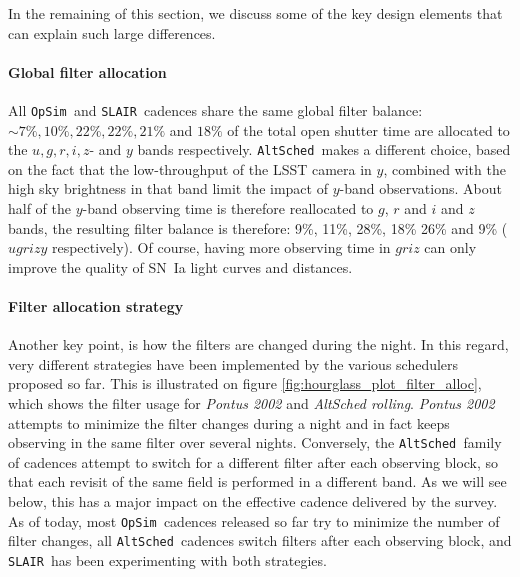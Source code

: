 \documentclass [11pt,a4paper]{article}
\newcommand{\opsim}{{\tt OpSim\ }}
\newcommand{\slair}{{\tt SLAIR\ }}
\newcommand{\altsched}{{\tt AltSched\ }}
\begin{document}
In the remaining of this section, we discuss some of the key design
elements that can explain such large differences.


\paragraph{Global filter allocation} All \opsim and \slair cadences   share the same global filter balance: 
$\sim 7\%, 10\%, 22\%, 22\%, 21\%$ and $18\%$ of the total open shutter time
are allocated to the $u, g, r, i, z$- and $y$ bands respectively.
\altsched makes a different choice, based on the fact that the
low-throughput of the LSST camera in $y$, combined with the high sky
brightness in that band limit the impact of $y$-band observations.
About half of the $y$-band observing time is therefore reallocated to
$g$, $r$ and $i$ and $z$ bands, the resulting filter balance is
therefore: 9\%, 11\%, 28\%, 18\% 26\% and 9\% ($ugrizy$ respectively). Of course, having more
observing time in $griz$ can only improve the quality of SN~Ia light curves and distances.


\paragraph{Filter allocation strategy} Another key point, is how the filters are
changed during the night.  In this regard, very different strategies
have been implemented by the various schedulers proposed so far.  This
is illustrated on figure \ref{fig:hourglass_plot_filter_alloc}, which
shows the filter usage for  {\em Pontus 2002} and {\em
  AltSched rolling}.  {\em Pontus 2002} attempts to minimize the
filter changes during a night and in fact keeps observing in the same
filter over several nights.  Conversely, the \altsched family of
cadences attempt to switch for a different filter after each observing
block, so that each revisit of the same field is performed in a
different band.  As we will see below, this has a major impact on the effective cadence
delivered by the survey. As of today, most \opsim cadences released so
far try to minimize the number of filter changes, all \altsched cadences
switch filters after each observing block, and \slair has been
experimenting with both strategies.
\end{document}
